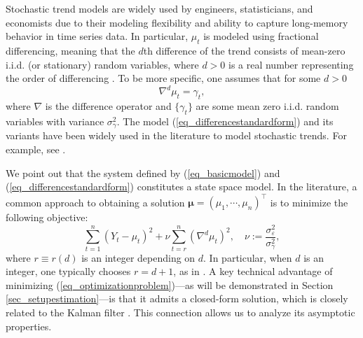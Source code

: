 \documentclass[11pt]{article}
\numberwithin{equation}{section}
\numberwithin{figure}{section}
\begin{document}
Stochastic trend models are widely used by engineers, statisticians, and economists \cite{box2015time, durbin2000, hatanaka1996, shumway2025} due to their modeling flexibility and ability to capture long-memory behavior in time series data. In particular, $\mu_t$ is modeled using fractional differencing, meaning that the $d$th difference of the trend consists of mean-zero i.i.d. (or stationary) random variables, where $d > 0$ is a real number representing the order of differencing \cite{burman_shumway2009estimation,hartl2025robust,hassler2018time,nielsen2015asymptotics, palma2007long}. To be more specific, one assumes that for some $d>0$
\begin{equation}\label{eq_differencestandardform}
\nabla^d \mu_t=\gamma_t, 
\end{equation}
where $\nabla$ is the difference operator and $\{\gamma_t\}$ are some mean zero i.i.d. random variables with variance $\sigma^2_{\gamma}.$ The model (\ref{eq_differencestandardform}) and its variants have been widely used in the literature to model stochastic trends. For example, see \cite{burman_shumway2009estimation, CHANAOS, hang2006estimation, durbin2000, grassi2014long,haldrup2007estimation, hartl2022approximate, hassler2018time}.  

We point out that the system defined by (\ref{eq_basicmodel}) and (\ref{eq_differencestandardform}) constitutes a state space model. In the literature, a common approach to obtaining a solution $\bm{\mu} = (\mu_1, \cdots, \mu_n)^\top$ is to minimize the following objective:
\begin{equation}\label{eq_optimizationproblem}
\sum_{t=1}^n (Y_t - \mu_t)^2 + \nu \sum_{t=r}^n (\nabla^d \mu_t)^2, \quad \nu := \frac{\sigma_\varepsilon^2}{\sigma_\gamma^2},
\end{equation}
where $r \equiv r(d)$ is an integer depending on $d$. In particular, when $d$ is an integer, one typically chooses $r = d+1$, as in \cite{burman_shumway2009estimation}. A key technical advantage of minimizing (\ref{eq_optimizationproblem})—as will be demonstrated in Section \ref{sec_setupestimation}—is that it admits a closed-form solution, which is closely related to the Kalman filter \cite{burman_shumway2009estimation, hartl2025robust}. This connection allows us to analyze its asymptotic properties.   
\end{document}

